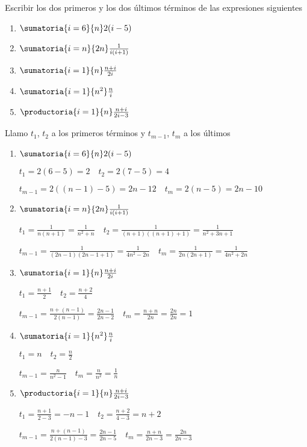\begin{enunciado}{\ejercicio}

  Escribir los dos primeros y los dos últimos términos de las expresiones siguientes
  \begin{multicols}{5}
    \begin{enumerate}[label=\roman*)]
      \item $\sumatoria{i=6}{n} 2(i - 5)$
      \item $\sumatoria{i=n}{2n} \frac{1}{i(i+1)}$
      \item $\sumatoria{i=1}{n} \frac{n + i}{2i}$
      \item $\sumatoria{i=1}{n^2} \frac{n}{i}$
      \item $\productoria{i=1}{n} \frac{n + i}{2i - 3}$
    \end{enumerate}
  \end{multicols}

\end{enunciado}
Llamo $t_1$, $t_2$ a los primeros términos y $t_{m-1}$, $t_m$ a los últimos\\

\begin{enumerate}[label=\roman*)]
  \item $\sumatoria{i=6}{n}2(i - 5)$\par

        $t_1 = 2(6 - 5) = 2 \quad t_2 = 2(7 - 5) = 4$\par
        $t_{m-1} = 2((n - 1) - 5) = 2n - 12 \quad t_m = 2(n - 5) = 2n - 10$

  \item $\sumatoria{i=n}{2n} \frac{1}{i(i+1)}$\par
        $t_1 = \frac{1}{n(n + 1)} = \frac{1}{n^2 + n} \quad t_2 = \frac{1}{(n+1)((n+1) + 1)} = \frac{1}{n^2 + 3n + 1}$\par
        $t_{m-1} = \frac{1}{(2n-1)(2n-1+1)} = \frac{1}{4n^2-2n} \quad t_m = \frac{1}{2n(2n+1)} = \frac{1}{4n^2 + 2n}$

  \item $\sumatoria{i=1}{n} \frac{n + i}{2i}$\par
        $t_1 = \frac{n + 1}{2} \quad t_2 = \frac{n + 2}{4}$\par
        $t_{m-1} = \frac{n + (n-1)}{2(n-1)} = \frac{2n - 1}{2n - 2} \quad t_m = \frac{n + n}{2n} = \frac{2n}{2n} = 1$

  \item $\sumatoria{i=1}{n^2} \frac{n}{i}$\par
        $t_1 = n \quad t_2 = \frac{n}{2}$\par
        $t_{m-1} = \frac{n}{n^2 - 1} \quad t_m = \frac{n}{n^2} = \frac{1}{n}$

  \item $\productoria{i=1}{n} \frac{n + i}{2i - 3}$\par
        $t_1 = \frac{n + 1}{2 - 3} = - n - 1 \quad t_2 = \frac{n + 2}{4 - 3} = n + 2$\par
        $t_{m-1} = \frac{n + (n-1)}{2(n-1) - 3} = \frac{2n - 1}{2n - 5} \quad t_m = \frac{n + n}{2n - 3} = \frac{2n}{2n - 3}$
\end{enumerate}
